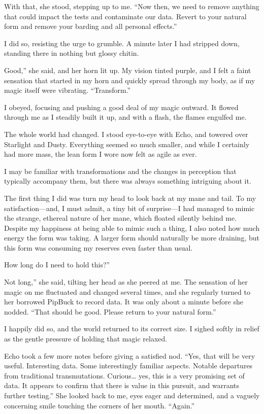 With that, she stood, stepping up to me. “Now then, we need to remove anything that could impact the tests and contaminate our data. Revert to your natural form and remove your barding and all personal effects.”

I did so, resisting the urge to grumble. A minute later I had stripped down, standing there in nothing but glossy chitin.

\leavevmode{}Good,” she said, and her horn lit up. My vision tinted purple, and I felt a faint sensation that started in my horn and quickly spread through my body, as if my magic itself were vibrating. “Transform.”

I obeyed, focusing and pushing a good deal of my magic outward. It flowed through me as I steadily built it up, and with a flash, the flames engulfed me.

The whole world had changed. I stood eye-to-eye with Echo, and towered over Starlight and Dusty. Everything seemed so much smaller, and while I certainly had more mass, the lean form I wore now felt as agile as ever.

I may be familiar with transformations and the changes in perception that typically accompany them, but there was always something intriguing about it.

The first thing I did was turn my head to look back at my mane and tail. To my satisfaction—and, I must admit, a tiny bit of surprise—I had managed to mimic the strange, ethereal nature of her mane, which floated silently behind me. Despite my happiness at being able to mimic such a thing, I also noted how much energy the form was taking. A larger form should naturally be more draining, but this form was consuming my reserves even faster than usual.

\leavevmode{}How long do I need to hold this?”

\leavevmode{}Not long,” she said, tilting her head as she peered at me. The sensation of her magic on me fluctuated and changed several times, and she regularly turned to her borrowed PipBuck to record data. It was only about a minute before she nodded. “That should be good. Please return to your natural form.”

I happily did so, and the world returned to its correct size. I sighed softly in relief as the gentle pressure of holding that magic relaxed.

Echo took a few more notes before giving a satisfied nod. “Yes, that will be very useful. Interesting data. Some interestingly familiar aspects. Notable departures from traditional transmutations. Curious… yes, this is a very promising set of data. It appears to confirm that there is value in this pursuit, and warrants further testing.” She looked back to me, eyes eager and determined, and a vaguely concerning smile touching the corners of her mouth. “Again.”

